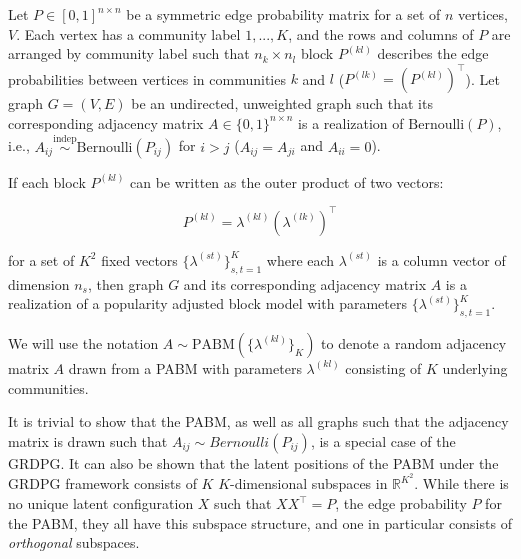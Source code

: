 \documentclass[
  11pt,
]{article}
\begin{document}
\begin{definition}
\label{pabm}
Let $P \in [0, 1]^{n \times n}$ be a symmetric edge probability matrix for a 
set of $n$ 
vertices, $V$. Each vertex has a community label $1, ..., K$, and the rows and 
columns of $P$ are arranged by community label such that $n_k \times n_l$ block 
$P^{(kl)}$ describes the edge probabilities between vertices in communities 
$k$ and $l$ ($P^{(lk)} = (P^{(kl)})^\top$). 
Let graph $G = (V, E)$ be an undirected, unweighted graph such 
that its corresponding adjacency matrix $A \in \{0, 1\}^{n \times n}$ is a 
realization of $\text{Bernoulli}(P)$, i.e., 
$A_{ij} \stackrel{\text{indep}}{\sim}\text{Bernoulli}(P_{ij})$ for $i > j$ 
($A_{ij} = A_{ji}$ and $A_{ii} = 0$). 

If each block $P^{(kl)}$ can be written as the outer product of two vectors:

\begin{equation} \label{eq:pabm}
  P^{(kl)} = \lambda^{(kl)} (\lambda^{(lk)})^\top
\end{equation}

for a set of $K^2$ fixed vectors $\{\lambda^{(st)}\}_{s, t = 1}^K$ where each 
$\lambda^{(st)}$ is a column vector 
of dimension $n_s$, then graph $G$ and its corresponding adjacency matrix $A$ 
is a realization of a popularity adjusted block model with parameters 
$\{\lambda^{(st)}\}_{s, t = 1}^K$. 
\end{definition}

We will use the notation \(A \sim \text{PABM}(\{\lambda^{(kl)}\}_K)\) to
denote a random adjacency matrix \(A\) drawn from a PABM with parameters
\(\lambda^{(kl)}\) consisting of \(K\) underlying communities.

It is trivial to show that the PABM, as well as all graphs such that the
adjacency matrix is drawn such that \(A_{ij} \sim Bernoulli(P_{ij})\),
is a special case of the GRDPG. It can also be shown that the latent
positions of the PABM under the GRDPG framework consists of \(K\)
\(K\)-dimensional subspaces in \(\mathbb{R}^{K^2}\). While there is no
unique latent configuration \(X\) such that \(X X^\top = P\), the edge
probability \(P\) for the PABM, they all have this subspace structure,
and one in particular consists of \emph{orthogonal} subspaces.
\end{document}

